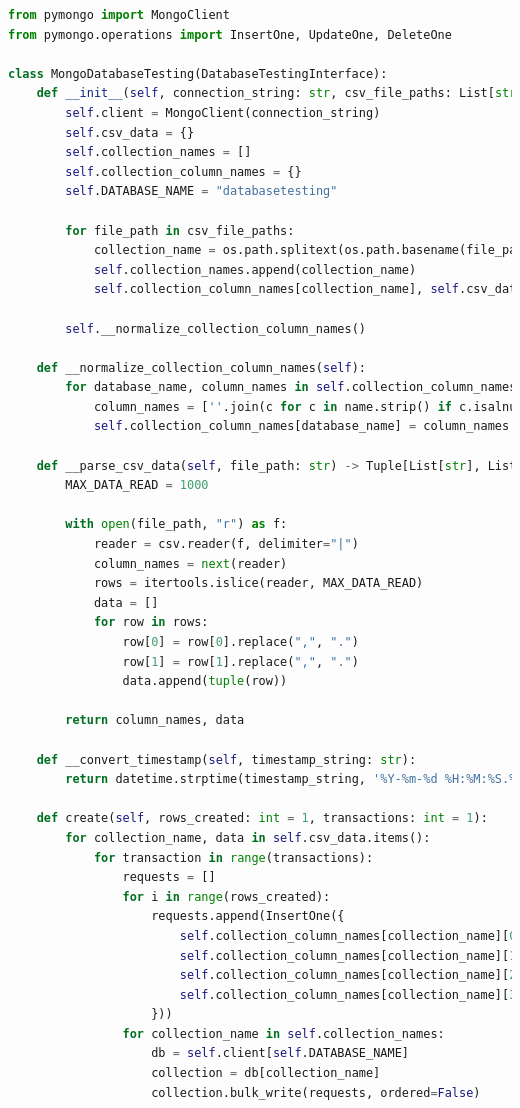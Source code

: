 \begin{lstlisting}[language=Python, caption=MongoDatabaseTesting]
from pymongo import MongoClient
from pymongo.operations import InsertOne, UpdateOne, DeleteOne

class MongoDatabaseTesting(DatabaseTestingInterface):
    def __init__(self, connection_string: str, csv_file_paths: List[str]):
        self.client = MongoClient(connection_string)
        self.csv_data = {}
        self.collection_names = []
        self.collection_column_names = {}
        self.DATABASE_NAME = "databasetesting"

        for file_path in csv_file_paths:
            collection_name = os.path.splitext(os.path.basename(file_path))[0]
            self.collection_names.append(collection_name)
            self.collection_column_names[collection_name], self.csv_data[collection_name] = self.__parse_csv_data(file_path)

        self.__normalize_collection_column_names()

    def __normalize_collection_column_names(self):
        for database_name, column_names in self.collection_column_names.items():
            column_names = [''.join(c for c in name.strip() if c.isalnum() or c == '_') for name in column_names]
            self.collection_column_names[database_name] = column_names

    def __parse_csv_data(self, file_path: str) -> Tuple[List[str], List[Tuple[str, str, float, int]]]:
        MAX_DATA_READ = 1000

        with open(file_path, "r") as f:
            reader = csv.reader(f, delimiter="|")
            column_names = next(reader)
            rows = itertools.islice(reader, MAX_DATA_READ)
            data = []
            for row in rows:
                row[0] = row[0].replace(",", ".")
                row[1] = row[1].replace(",", ".")
                data.append(tuple(row))

        return column_names, data

    def __convert_timestamp(self, timestamp_string: str):
        return datetime.strptime(timestamp_string, '%Y-%m-%d %H:%M:%S.%f').timestamp()

    def create(self, rows_created: int = 1, transactions: int = 1):
        for collection_name, data in self.csv_data.items():
            for transaction in range(transactions):
                requests = []
                for i in range(rows_created):
                    requests.append(InsertOne({
                        self.collection_column_names[collection_name][0]: self.__convert_timestamp(data[i][0]),
                        self.collection_column_names[collection_name][1]: self.__convert_timestamp(data[i][1]),
                        self.collection_column_names[collection_name][2]: data[i][2],
                        self.collection_column_names[collection_name][3]: data[i][3]
                    }))
                for collection_name in self.collection_names:
                    db = self.client[self.DATABASE_NAME]
                    collection = db[collection_name]
                    collection.bulk_write(requests, ordered=False)


\end{lstlisting}
